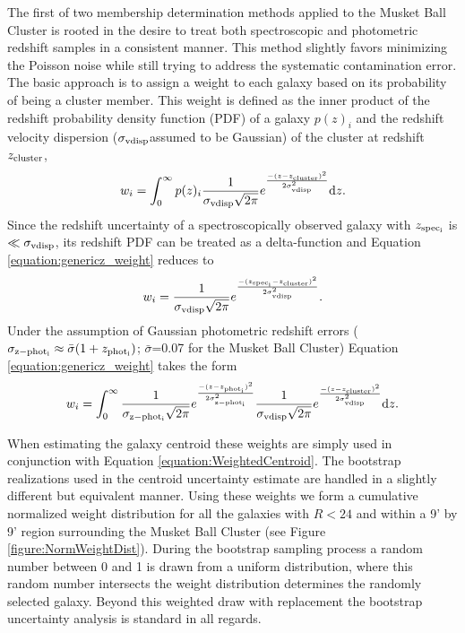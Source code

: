 The first of two membership determination methods applied to the Musket Ball Cluster is rooted in the desire to treat both spectroscopic and photometric redshift samples in a consistent manner. 
This method slightly favors minimizing the Poisson noise while still trying to address the systematic contamination error. 
The basic approach is to assign a weight to each galaxy based on its probability of being a cluster member.
This weight is defined as the inner product of the redshift probability density function (PDF) of a galaxy $p(z)_i$ and the redshift velocity dispersion ($\sigma_{\rm vdisp}$assumed to be Gaussian) of the cluster at redshift $z_{\rm cluster}$,
\begin{equation}
w_i = \int_{0}^{\infty} p(z)_i \frac{1}{\sigma_{\rm vdisp}\sqrt{2\pi}}e^{\frac{-(z-z_{\rm cluster})^2}{2\sigma_{\rm vdisp}^2}}\mathrm{d}z.
\label{equation:genericz_weight}
\end{equation}
Since the redshift uncertainty of a spectroscopically observed galaxy with $z_{\rm spec_{i}}$ is $\ll \sigma_{\rm vdisp}$, its redshift PDF can be treated as a delta-function and Equation \ref{equation:genericz_weight} reduces to
\begin{equation}
w_i = \frac{1}{\sigma_{\rm vdisp}\sqrt{2\pi}}e^{\frac{-(z_{\rm spec_{i}}-z_{\rm cluster})^2}{2\sigma_{\rm vdisp}^2}}.
\end{equation}\label{equation:specz_weight}
Under the assumption of Gaussian photometric redshift errors ($\sigma_{\rm z-phot_{i}} \approx \bar{\sigma}(1+z_{\rm phot_{i}})$; $\bar{\sigma}$=0.07 for the Musket Ball Cluster) Equation \ref{equation:genericz_weight} takes the form
\begin{equation}
w_i = \int_{0}^{\infty} \frac{1}{\sigma_{\rm z-phot_{i}}\sqrt{2\pi}}e^{\frac{-(z-z_{\rm phot_{i}})^2}{2\sigma_{\rm z-phot_{i}}^2}} \frac{1}{\sigma_{\rm vdisp}\sqrt{2\pi}}e^{\frac{-(z-z_{\rm cluster})^2}{2\sigma_{\rm vdisp}^2}}\mathrm{d}z.
\label{equation:photoz_weight}
\end{equation}

When estimating the galaxy centroid these weights are simply used in conjunction with Equation \ref{equation:WeightedCentroid}.
The bootstrap realizations used in the centroid uncertainty estimate are handled in a slightly different but equivalent manner.
Using these weights we form a cumulative normalized weight distribution for all the galaxies with $R<24$ and within a 9' by 9' region surrounding the Musket Ball Cluster (see Figure \ref{figure:NormWeightDist}).
During the bootstrap sampling process a random number between 0 and 1 is drawn from a uniform distribution, where this random number intersects the weight distribution determines the randomly selected galaxy.
Beyond this weighted draw with replacement the bootstrap uncertainty analysis is standard in all regards.

